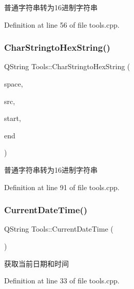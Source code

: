 普通字符串转为16进制字符串 



Definition at line 56 of file tools.\+cpp.

\mbox{\label{class_tools_ae4c5caed900acc0c2ca436929a753dff}} 
\subsubsection{\texorpdfstring{CharStringtoHexString()}{CharStringtoHexString()}\hspace{0.1cm}{\footnotesize\ttfamily [2/2]}}
{\footnotesize\ttfamily Q\+String Tools\+::\+Char\+Stringto\+Hex\+String (\begin{DoxyParamCaption}\item[{Q\+String}]{space,  }\item[{const char $\ast$}]{src,  }\item[{int}]{start,  }\item[{int}]{end }\end{DoxyParamCaption})}



普通字符串转为16进制字符串 



Definition at line 91 of file tools.\+cpp.

\mbox{\label{class_tools_a438ea9326a6ae735d51bc3508c430a3b}} 
\subsubsection{\texorpdfstring{CurrentDateTime()}{CurrentDateTime()}}
{\footnotesize\ttfamily Q\+String Tools\+::\+Current\+Date\+Time (\begin{DoxyParamCaption}{ }\end{DoxyParamCaption})}



获取当前日期和时间 



Definition at line 33 of file tools.\+cpp.

\mbox{\label{class_tools_a70173de28152ff05b140b9895de99e20}} 
